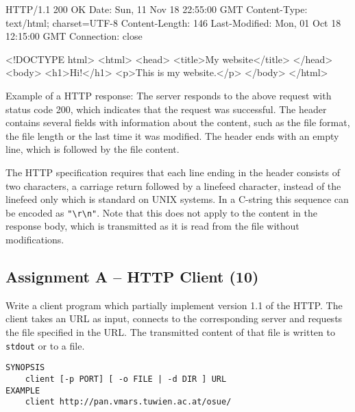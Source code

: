 \begin{center}
\begin{minipage}{8cm}
\begin{osuefmtcode}
HTTP/1.1 200 OK
Date: Sun, 11 Nov 18 22:55:00 GMT
Content-Type: text/html; charset=UTF-8
Content-Length: 146
Last-Modified: Mon, 01 Oct 18 12:15:00 GMT
Connection: close

<!DOCTYPE html>
<html>
  <head>
    <title>My website</title>
  </head>
  <body>
    <h1>Hi!</h1>
    <p>This is my website.</p>
  </body>
</html>
\end{osuefmtcode}
\end{minipage}
\begin{minipage}{12cm}
\vspace{3mm}
\footnotesize{Example of a HTTP response:
The server responds to the above request with status code 200,
which indicates that the request was successful.
The header contains several fields with information about the content,
such as the file format, the file length or the last time it was modified.
The header ends with an empty line, which is followed by the file content.}
\end{minipage}
\end{center}

The HTTP specification requires
that each line ending in the header consists of two characters,
a carriage return followed by a linefeed character,
instead of the linefeed only which is standard on UNIX systems.
In a C-string this sequence can be encoded as \verb|"\r\n"|.
Note that this does not apply to the content in the response body,
which is transmitted as it is read from the file without modifications.


\subsection*{Assignment A -- HTTP Client (10)}

Write a client program
which partially implement version 1.1 of the HTTP.
The client takes an URL as input,
connects to the corresponding server
and requests the file specified in the URL.
The transmitted content of that file is written to \verb|stdout| or to a file.

\vspace{-3mm}

\begin{verbatim}
SYNOPSIS
    client [-p PORT] [ -o FILE | -d DIR ] URL
EXAMPLE
    client http://pan.vmars.tuwien.ac.at/osue/
\end{verbatim}

